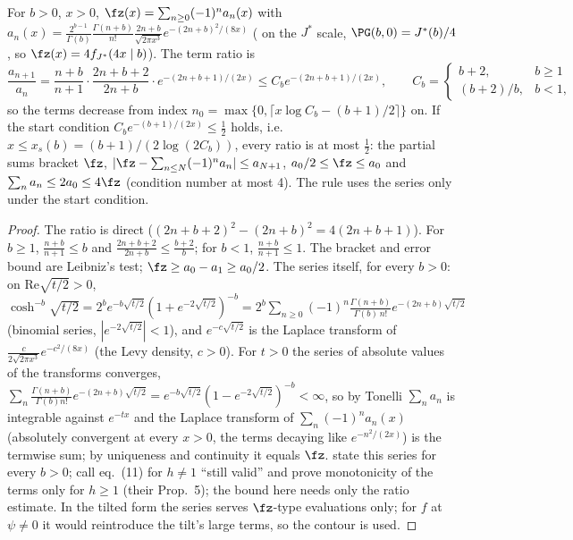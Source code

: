 \begin{proposition}\label{prop:left}
For $b>0$, $x>0$, $\fz(x)=\sum_{n\ge0}(-1)^na_n(x)$ with
$a_n(x)=\frac{2^{b-1}}{\Gamma(b)}\frac{\Gamma(n+b)}{n!}\frac{2n+b}{\sqrt{2\pi x^3}}e^{-(2n+b)^2/(8x)}$
(\cite[eq.~(11)]{wps} on the $J^*$ scale, $\PG(b,0)=J^*(b)/4$, so $\fz(x)=4f_{J^*}(4x\mid b)$). The term ratio is
\[
\frac{a_{n+1}}{a_n}=\frac{n+b}{n+1}\cdot\frac{2n+b+2}{2n+b}\cdot e^{-(2n+b+1)/(2x)}\le C_be^{-(2n+b+1)/(2x)},
\qquad C_b=\begin{cases}b+2,&b\ge1\\(b+2)/b,&b<1,\end{cases}
\]
so the terms decrease from index $n_0=\max\{0,\lceil x\log C_b-(b+1)/2\rceil\}$ on. If the start condition
$C_be^{-(b+1)/(2x)}\le\frac12$ holds, i.e. $x\le x_s(b)=(b+1)/(2\log(2C_b))$, every ratio is at most $\frac12$:
the partial sums bracket $\fz$, $|\fz-\sum_{n\le N}(-1)^na_n|\le a_{N+1}$, $a_0/2\le\fz\le a_0$ and
$\sum_na_n\le2a_0\le4\fz$ (condition number at most 4). The rule uses the series only under the start condition.
\end{proposition}
\begin{proof}
The ratio is direct ($(2n+b+2)^2-(2n+b)^2=4(2n+b+1)$). For $b\ge1$, $\frac{n+b}{n+1}\le b$ and
$\frac{2n+b+2}{2n+b}\le\frac{b+2}b$; for $b<1$, $\frac{n+b}{n+1}\le1$. The bracket and error bound are Leibniz's
test; $\fz\ge a_0-a_1\ge a_0/2$. The series itself, for every $b>0$: on $\mathrm{Re}\sqrt{t/2}>0$,
$\cosh^{-b}\sqrt{t/2}=2^be^{-b\sqrt{t/2}}(1+e^{-2\sqrt{t/2}})^{-b}=2^b\sum_{n\ge0}(-1)^n\frac{\Gamma(n+b)}{\Gamma(b)\,n!}
e^{-(2n+b)\sqrt{t/2}}$ (binomial series, $|e^{-2\sqrt{t/2}}|<1$), and $e^{-c\sqrt{t/2}}$ is the Laplace transform of
$\frac{c}{2\sqrt{2\pi x^3}}e^{-c^2/(8x)}$ (the Levy density, $c>0$). For $t>0$ the series of absolute values of the
transforms converges, $\sum_n\frac{\Gamma(n+b)}{\Gamma(b)n!}e^{-(2n+b)\sqrt{t/2}}=e^{-b\sqrt{t/2}}(1-e^{-2\sqrt{t/2}})^{-b}
<\infty$, so by Tonelli $\sum_na_n$ is integrable against $e^{-tx}$ and the Laplace transform of
$\sum_n(-1)^na_n(x)$ (absolutely convergent at every $x>0$, the terms decaying like $e^{-n^2/(2x)}$) is the
termwise sum; by uniqueness and continuity it equals $\fz$.
\cite[Sec.~2.3]{psw} state this series for every $b>0$; \cite[Sec.~4.1]{wps} call eq.~(11) for $h\ne1$ ``still
valid'' and prove monotonicity of the terms only for $h\ge1$ (their Prop.~5); the bound here needs only the ratio
estimate. In the tilted form the series serves $\fz$-type evaluations only; for $f$ at $\psi\ne0$ it would
reintroduce the tilt's large terms, so the contour is used.
\end{proof}

